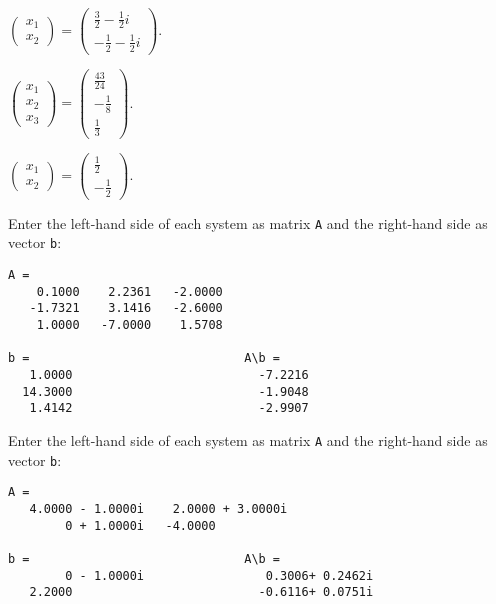$\left(\begin{array}{c} x_1 \\ x_2\end{array}\right) =
\left(\begin{array}{r} \frac{3}{2} - \frac{1}{2}i \\ -\frac{1}{2} -
\frac{1}{2}i\end{array}\right).$

$\left(\begin{array}{c} x_1 \\ x_2 \\ x_3\end{array}\right) =
\left(\begin{array}{r} 
\frac{43}{24} \\ -\frac{1}{8} \\ \frac{1}{3} \end{array}\right)$.

$\left(\begin{array}{c} x_1 \\ x_2\end{array}\right) =
\left(\begin{array}{r} \frac{1}{2} \\ -\frac{1}{2} \end{array}\right)$.


Enter the left-hand side of each system as matrix {\tt A} 
and the right-hand side as vector {\tt b}:

\begin{verbatim}
A =                           
    0.1000    2.2361   -2.0000
   -1.7321    3.1416   -2.6000
    1.0000   -7.0000    1.5708

b =                              A\b =
   1.0000                          -7.2216
  14.3000                          -1.9048
   1.4142                          -2.9907
\end{verbatim}

Enter the left-hand side of each system as matrix {\tt A} 
and the right-hand side as vector {\tt b}:

\begin{verbatim}
A =
   4.0000 - 1.0000i    2.0000 + 3.0000i
        0 + 1.0000i   -4.0000          

b =                              A\b =
        0 - 1.0000i                 0.3006+ 0.2462i
   2.2000                          -0.6116+ 0.0751i
\end{verbatim}

